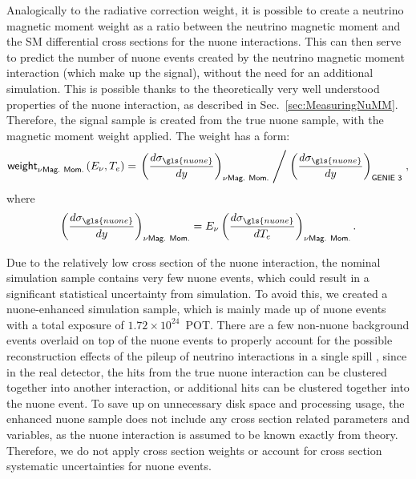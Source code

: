 Analogically to the radiative correction weight, it is possible to create a neutrino magnetic moment weight as a ratio between the neutrino magnetic moment and the \gls{SM} differential cross sections for the \gls{nuone} interactions. This can then serve to predict the number of \gls{nuone} events created by the neutrino magnetic moment interaction (which make up the signal), without the need for an additional simulation. This is possible thanks to the theoretically very well understood properties of the \gls{nuone} interaction, as described in Sec.~\ref{sec:MeasuringNuMM}. Therefore, the signal sample is created from the true \gls{nuone} sample, with the magnetic moment weight applied. The weight has a form:
\begin{equation}
\textsf{weight}_{\nu \textsf{Mag. Mom.}}\left(E_\nu,T_e\right) = \left.\left(\frac{d\sigma_{\gls{nuone}}}{dy}\right)_{\nu \textsf{Mag. Mom.}}\; \middle/\; \left(\frac{d\sigma_{\gls{nuone}}}{dy}\right)_{\textsf{GENIE 3}}\right.,
\end{equation}
where
\begin{equation}
\left(\frac{d\sigma_{\gls{nuone}}}{dy}\right)_{\nu \textsf{Mag. Mom.}} = E_\nu \left(\frac{d\sigma_{\gls{nuone}}}{dT_e}\right)_{\nu \textsf{Mag. Mom.}}.
\end{equation}

Due to the relatively low cross section of the \gls{nuone} interaction, the nominal simulation sample contains very few \gls{nuone} events, which could result in a significant statistical uncertainty from simulation. To avoid this, we created a \gls{nuone}-enhanced simulation sample, which is mainly made up of \gls{nuone} events with a total exposure of $1.72\times10^{24}$~\gls{POT}. There are a few non-\gls{nuone} background events overlaid on top of the \gls{nuone} events to properly account for the possible reconstruction effects of the pileup of neutrino interactions in a single spill \cite{NOVA-doc-56383}, since in the real detector, the hits from the true \gls{nuone} interaction can be clustered together into another interaction, or additional hits can be clustered together into the \gls{nuone} event. To save up on unnecessary disk space and processing usage, the enhanced \gls{nuone} sample does not include any cross section related parameters and variables, as the \gls{nuone} interaction is assumed to be known exactly from theory. Therefore, we do not apply cross section weights or account for cross section systematic uncertainties for \gls{nuone} events.


